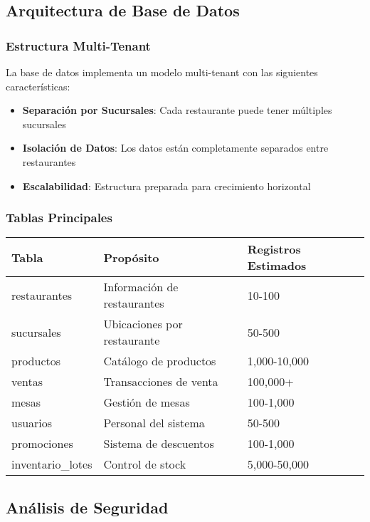 \documentclass[12pt,a4paper]{article}
\begin{document}
\subsection{Arquitectura de Base de Datos}

\subsubsection{Estructura Multi-Tenant}

La base de datos implementa un modelo multi-tenant con las siguientes características:

\begin{itemize}
    \item \textbf{Separación por Sucursales}: Cada restaurante puede tener múltiples sucursales
    \item \textbf{Isolación de Datos}: Los datos están completamente separados entre restaurantes
    \item \textbf{Escalabilidad}: Estructura preparada para crecimiento horizontal
\end{itemize}

\subsubsection{Tablas Principales}

\begin{longtable}{|l|l|l|}
\hline
\textbf{Tabla} & \textbf{Propósito} & \textbf{Registros Estimados} \\
\hline
restaurantes & Información de restaurantes & 10-100 \\
sucursales & Ubicaciones por restaurante & 50-500 \\
productos & Catálogo de productos & 1,000-10,000 \\
ventas & Transacciones de venta & 100,000+ \\
mesas & Gestión de mesas & 100-1,000 \\
usuarios & Personal del sistema & 50-500 \\
promociones & Sistema de descuentos & 100-1,000 \\
inventario\_lotes & Control de stock & 5,000-50,000 \\
\hline
\end{longtable}

\subsection{Análisis de Seguridad}
\end{document}
